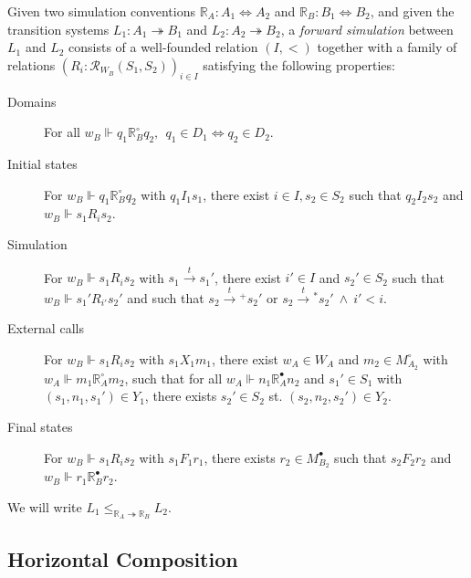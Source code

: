 \documentclass[sigplan,10pt,review,anonymous]{acmart}\settopmatter{printfolios=true,printccs=false,printacmref=false}
\newcommand{\que}{\circ}
\newcommand{\ans}{\bullet}
\begin{document}
\begin{definition}
Given
two simulation conventions
$\mathbb{R}_A : A_1 \Leftrightarrow A_2$ and
$\mathbb{R}_B : B_1 \Leftrightarrow B_2$,
and given
the transition systems
$L_1 : A_1 \twoheadrightarrow B_1$ and
$L_2 : A_2 \twoheadrightarrow B_2$,
a \emph{forward simulation} between $L_1$ and $L_2$
consists of a
well-founded relation $(I, <)$
together with a family of relations
$(R_i : \mathcal{R}_{W_B}(S_1, S_2))_{i \in I}$
satisfying the following properties:
\begin{description}
\item[Domains]
  For all
  $w_B \Vdash q_1 \mathrel{\mathbb{R}_B^\que} q_2, \:\:
   q_1 \in D_1 \Leftrightarrow q_2 \in D_2$.
\item[Initial states]
  For
  $w_B \Vdash q_1 \mathrel{\mathbb{R}_B^\que} q_2$
  with $q_1 \mathrel{I_1} s_1$,
  there exist $i \in I, s_2 \in S_2$
  such that $q_2 \mathrel{I_2} s_2$ and
  $w_B \Vdash s_1 \mathrel{R_i} s_2$.
\item[Simulation]
  For $w_B \Vdash s_1 \mathrel{R_i} s_2$
  with $s_1 \stackrel{t}{\rightarrow} s_1'$,
  there exist $i' \in I$ and $s_2' \in S_2$
  such that $w_B \Vdash s_1' \mathrel{R_{i'}} s_2'$ and
  such that
    $s_2 \mathrel{\stackrel{t}{\rightarrow}{\!\!}^+} s_2'$ or
    $s_2 \mathrel{\stackrel{t}{\rightarrow}{\!\!}^*} s_2' \:\wedge\: i' < i$.
\item[External calls]
  For $w_B \Vdash s_1 \mathrel{R_i} s_2$
  with $s_1 \mathrel{X_1} m_1$,
  there exist $w_A \in W_A$ and $m_2 \in M_{A_2}^\que$
  with $w_A \Vdash m_1 \mathrel{\mathbb{R}_A^\que} m_2$,
  such that for all
  $w_A \Vdash n_1 \mathrel{\mathbb{R}_A^\ans} n_2$
  and $s_1' \in S_1$ with $(s_1, n_1, s_1') \in Y_1$,
  there exists $s_2' \in S_2$ st.
  $(s_2, n_2, s_2') \in Y_2$.
\item[Final states]
  For $w_B \Vdash s_1 \mathrel{R_i} s_2$
  with $s_1 \mathrel{F_1} r_1$,
  there exists $r_2 \in M_{B_2}^\ans$ such that
  $s_2 \mathrel{F_2} r_2$ and $w_B \Vdash r_1 \mathrel{\mathbb{R}_B^\ans} r_2$.
\end{description}
We will write $L_1 \le_{\mathbb{R}_A \twoheadrightarrow \mathbb{R}_B} L_2$.
\end{definition}


\subsection{Horizontal Composition} \label{sec:sem:linker} %
\end{document}
